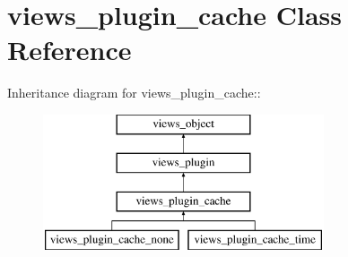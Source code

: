 \hypertarget{classviews__plugin__cache}{
\section{views\_\-plugin\_\-cache Class Reference}
\label{classviews__plugin__cache}
}
Inheritance diagram for views\_\-plugin\_\-cache::\begin{figure}[H]
\begin{center}
\leavevmode
\includegraphics[height=4cm]{classviews__plugin__cache}
\end{center}
\end{figure}
